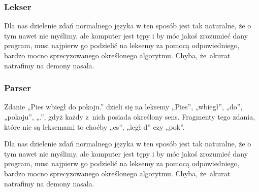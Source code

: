 \documentclass[10pt,t]{beamer}
\begin{document}






\begin{frame}
  \frametitle{Lekser}


  Dla nas dzielenie zdań normalnego języka w ten sposób jest tak naturalne,
  że o tym nawet nie myślimy, ale komputer jest tępy i by móc jakoś
  zrozumieć dany program, musi najpierw go podzielić na leksemy za pomocą
  odpowiedniego, bardzo mocno sprecyzowanego określonego algorytmu.
  Chyba, że~akurat natrafimy na
  {demony nasala}.

\end{frame}





\begin{frame}
  \frametitle{Parser}


  Zdanie „Pies wbiegł do pokoju.” dzieli się na leksemy „Pies”, „wbiegł”,
  „do”, „pokoju”, „.”, gdyż każdy z~nich posiada określony sens. Fragmenty
  tego zdania, które nie są leksemami to choćby „es”, „iegł d” czy „pok”.

  Dla nas dzielenie zdań normalnego języka w ten sposób jest tak naturalne,
  że o tym nawet nie myślimy, ale komputer jest tępy i by móc jakoś
  zrozumieć dany program, musi najpierw go podzielić na leksemy za pomocą
  odpowiedniego, bardzo mocno sprecyzowanego określonego algorytmu.
  Chyba, że~akurat natrafimy na
  {demony nasala}.

\end{frame}
\end{document}
